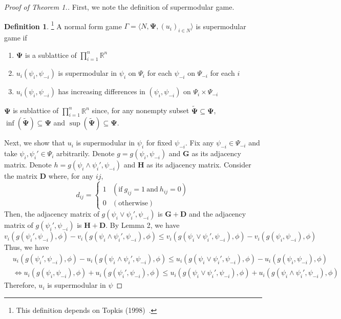 \documentclass[12pt]{article}
\theoremstyle{definition}
\newtheorem{definition}{Definition}
\begin{document}
\begin{proof}[Proof of Theorem 1.]
	First, we note the definition of supermodular game.

	\begin{definition}\footnote{This definition depends on Topkis (1998)~\cite{topkis1998}.}
		A normal form game $\Gamma = \langle N, \bm{\Psi}, {(u_i)}_{i \in N} \rangle$ is supermodular game if
		\begin{enumerate}
			\item $\bm{\Psi}$ is a sublattice of $\prod_{i=1}^n \mathbb{R}^n$
			\item $u_i(\psi_i, \psi_{-i})$ is supermodular in $\psi_i$ on $\Psi_i$ for each $\psi_{-i}$ on $\Psi_{-i}$ for each $i$
			\item $u_i(\psi_i, \psi_{-i})$ has increasing differences in $(\psi_i, \psi_{-i})$ on $\Psi_i \times \Psi_{-i}$
		\end{enumerate}
	\end{definition}

	$\bm{\Psi}$ is sublattice of $\prod_{i=1}^n \mathbb{R}^n$ since, for any nonempty subset $\bm{\tilde{\Psi}} \subseteq \bm{\Psi}$, $\inf(\bm{\tilde{\Psi}}) \subseteq \bm{\Psi}$ and $\sup(\bm{\tilde{\Psi}}) \subseteq \bm{\Psi}$.

	Next, we show that $u_i$ is supermodular in $\psi_i$ for fixed $\psi_{-i}$.
	Fix any $\psi_{-i} \in \Psi_{-i}$ and take $\psi_i, \psi_i' \in \Psi_i$ arbitrarily.
	Denote $g = g(\psi_i, \psi_{-i})$ and $\bm{G}$ as its adjacency matrix.
	Denote $h = g(\psi_i \wedge \psi_i', \psi_{-i})$ and $\bm{H}$ as its adjacency matrix.
	Consider the matrix $\bm{D}$ where, for any $ij$,
	\[ d_{ij} = \begin{cases}
					1 & (\text{if} \ g_{ij} = 1 \ \text{and} \ h_{ij} = 0) \\
					0 & (\text{otherwise})
				\end{cases} \]
	Then, the adjacency matrix of $g(\psi_i \vee \psi_i', \psi_{-i})$ is $\bm{G} + \bm{D}$ and the adjacency matrix of $g(\psi_i', \psi_{-i})$ is $\bm{H} + \bm{D}$.
	By Lemma 2, we have
	\[ v_i(g(\psi_i', \psi_{-i}), \phi) - v_i(g(\psi_i \wedge \psi_i', \psi_{-i}), \phi) \le v_i(g(\psi_i \vee \psi_i', \psi_{-i}), \phi) - v_i(g(\psi_i, \psi_{-i}), \phi) \]
	Thus, we have
	\begin{align*}
	& u_i(g(\psi_i', \psi_{-i}), \phi) - u_i(g(\psi_i \wedge \psi_i', \psi_{-i}), \phi) \le u_i(g(\psi_i \vee \psi_i', \psi_{-i}), \phi) - u_i(g(\psi_i, \psi_{-i}), \phi) \\
		& \Leftrightarrow u_i(g(\psi_i, \psi_{-i}), \phi) + u_i(g(\psi_i', \psi_{-i}), \phi) \le u_i(g(\psi_i \vee \psi_i', \psi_{-i}), \phi) + u_i(g(\psi_i \wedge \psi_i', \psi_{-i}), \phi) 
	\end{align*}
	Therefore, $u_i$ is supermodular in $\psi$


\end{proof}
\end{document}

